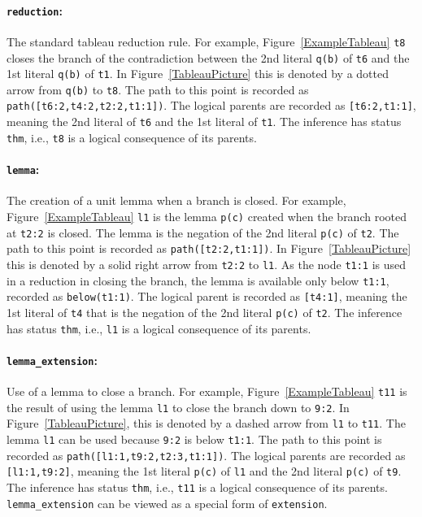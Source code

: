 \documentclass[runningheads]{llncs}
\newcommand{\smalltt}[1]{\small \texttt{#1}}
\newcommand{\mytilde}{\raisebox{0.4ex}{\texttildelow}}
\begin{document}
{\paragraph{{\tt reduction}:} The standard tableau reduction rule.
For example, Figure~\ref{ExampleTableau} {\smalltt{t8}} closes the branch of the contradiction 
between the 2nd literal {\smalltt{{\mytilde}q(b)}} of {\smalltt{t6}} and the 1st literal 
{\smalltt{q(b)}} of {\smalltt{t1}}.
In Figure~\ref{TableauPicture} this is denoted by a dotted arrow from {\smalltt{{\mytilde}q(b)}} to 
{\smalltt{t8}}.
The path to this point is recorded as {\smalltt{path([t6:2,t4:2,t2:2,t1:1])}}.
The logical parents are recorded as {\smalltt{[t6:2,t1:1]}}, meaning the 2nd literal of 
{\smalltt{t6}} and the 1st literal of {\smalltt{t1}}. 
The inference has status {\smalltt{thm}}, i.e., {\smalltt{t8}} is a logical consequence of its 
parents.

\paragraph{{\tt lemma}:} The creation of a unit lemma when a branch is closed.
For example, Figure~\ref{ExampleTableau} {\smalltt{l1}} is the lemma {\smalltt{p(c)}} created 
when the branch rooted at {\smalltt{t2:2}} is closed.
The lemma is the negation of the 2nd literal {\smalltt{{\mytilde}p(c)}} of {\smalltt{t2}}.
The path to this point is recorded as {\smalltt{path([t2:2,t1:1])}}.
In Figure~\ref{TableauPicture} this is denoted by a solid right arrow from {\smalltt{t2:2}} to 
{\smalltt{l1}}.
As the node {\smalltt{t1:1}} is used in a reduction in closing the branch, the lemma is
available only below {\smalltt{t1:1}}, recorded as {\smalltt{below(t1:1)}}.
The logical parent is recorded as {\smalltt{[t4:1]}}, meaning the 1st literal of
{\smalltt{t4}} that is the negation of the 2nd literal {\smalltt{{\mytilde}p(c)}} of {\smalltt{t2}}.
The inference has status {\smalltt{thm}}, i.e., {\smalltt{l1}} is a logical consequence of its 
parents.

\paragraph{{\tt lemma\_extension}:} Use of a lemma to close a branch.
For example, Figure~\ref{ExampleTableau} {\smalltt{t11}} is the result of using the lemma 
{\smalltt{l1}} to close the branch down to {\smalltt{9:2}}. 
In Figure~\ref{TableauPicture}, this is denoted by a dashed arrow from {\smalltt{l1}} to 
{\smalltt{t11}}.
The lemma {\smalltt{l1}} can be used because {\smalltt{9:2}} is below {\smalltt{t1:1}}.
The path to this point is recorded as {\smalltt{path([l1:1,t9:2,t2:3,t1:1])}}.
The logical parents are recorded as {\smalltt{[l1:1,t9:2]}}, meaning the 1st literal 
{\smalltt{p(c)}} of {\smalltt{l1}} and the 2nd literal {\smalltt{{\mytilde}p(c)}} of 
{\smalltt{t9}}.
The inference has status {\smalltt{thm}}, i.e., {\smalltt{t11}} is a logical consequence of its
parents.
{\tt lemma\_extension} can be viewed as a special form of {\tt extension}.

}
\end{document}
